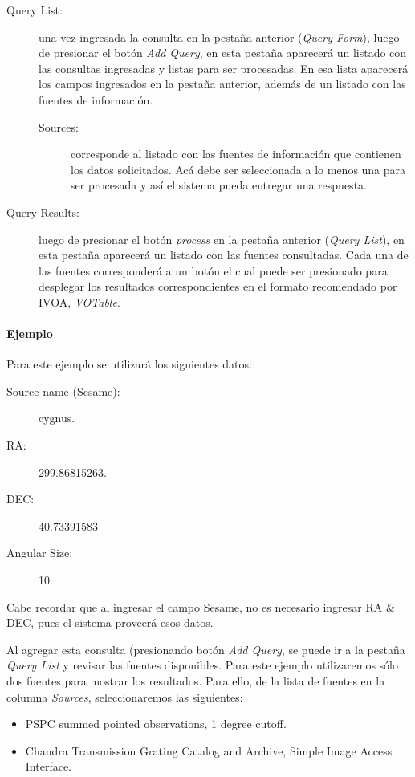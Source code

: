 \begin{description}
  \item [Query List:] una vez ingresada la consulta en la pestaña
    anterior (\emph{Query Form}), luego de presionar el botón
    \emph{Add Query}, en esta pestaña aparecerá un listado con las
    consultas ingresadas y listas para ser procesadas. En esa lista
    aparecerá los campos ingresados en la pestaña anterior, además de
    un listado con las fuentes de información.
    \begin{description}
      \item [Sources:] corresponde al listado con las fuentes de
	información que contienen los datos solicitados. Acá debe ser
	seleccionada a lo menos una para ser procesada y así el
	sistema pueda entregar una respuesta.
    \end{description}  
  \item [Query Results:] luego de presionar el botón \emph{process} en
    la pestaña anterior (\emph{Query List}), en esta pestaña
    aparecerá un listado con las fuentes consultadas. Cada una de las
    fuentes corresponderá a un botón el cual puede ser presionado para
    desplegar los resultados correspondientes en el formato
    recomendado por IVOA, \emph{VOTable}.
\end{description}

\paragraph{Ejemplo}

Para este ejemplo se utilizará los siguientes datos:

\begin{description}
  \item [Source name (Sesame):] cygnus.
  \item [RA:] 299.86815263.
  \item [DEC:] 40.73391583
  \item [Angular Size:] 10.
\end{description}

Cabe recordar que al ingresar el campo Sesame, no es necesario
ingresar RA \& DEC, pues el sistema proveerá esos datos.

Al agregar esta consulta (presionando botón \emph{Add Query}, se puede
ir a la pestaña \emph{Query List} y revisar las fuentes disponibles.
Para este ejemplo utilizaremos sólo dos fuentes para mostrar los
resultados. Para ello, de la lista de fuentes en la columna
\emph{Sources}, seleccionaremos las siguientes:

\begin{itemize}
  \item PSPC summed pointed observations, 1 degree cutoff.
  \item Chandra Transmission Grating Catalog and Archive, Simple Image
    Access Interface.
\end{itemize}

